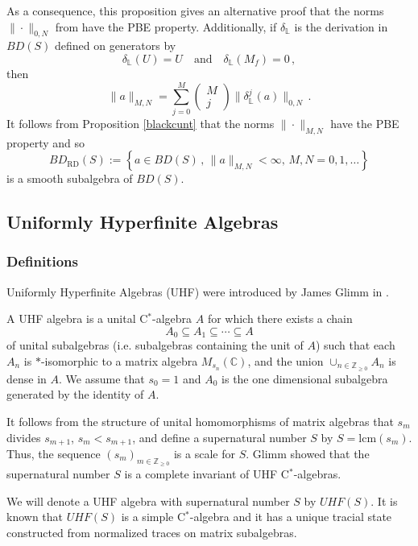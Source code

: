 \documentclass[12pt,reqno]{amsart}
\numberwithin{equation}{section}
\newcommand{\C}{{\mathbb C}}
\newcommand{\Z}{{\mathbb Z}}
\begin{document}
As a consequence, this proposition gives an alternative proof that the norms $\|\cdot\|_{0,N}$ from \cite{HKM1} have the PBE property.  Additionally, if $\delta_{\mathbb{L}}$ is the derivation in $BD(S)$ defined on generators by
\begin{equation*}
\delta_{\mathbb L}(U)=U\quad\textrm{and}\quad \delta_{\mathbb L}(M_f)=0\,,
\end{equation*}
then 
\begin{equation*}
\|a\|_{M,N} = \sum_{j=0}^M\left(
\begin{array}{c}
M \\ j
\end{array}\right)\|\delta_{\mathbb L}^{j}(a)\|_{0,N}\,.
\end{equation*}
It follows from Proposition \ref{blackcunt} that the norms $\|\cdot\|_{M,N}$ have the PBE property and so
\begin{equation*}
BD_\textrm{RD}(S) := \left\{a\in BD(S)\,,\,\|a\|_{M,N}<\infty,\,M,N=0,1,\ldots\right\}
\end{equation*}
is a smooth subalgebra of $BD(S)$.

\subsection{Uniformly Hyperfinite Algebras} 
\subsubsection{Definitions}
Uniformly Hyperfinite Algebras (UHF) were introduced by James Glimm  in  \cite{Gl}. 

A UHF algebra is a unital C$^*$-algebra $A$ for which there exists a chain 
$$A_0 \subseteq A_1 \subseteq \cdots\subseteq A$$
of unital subalgebras (i.e. subalgebras containing the unit of $A$) such that each $A_n$ is $*$-isomorphic to a matrix algebra $M_{s_n} (\C)$, and the union
$\cup_{n\in\Z_{\geq0}}A_n$ is dense in $A$. We assume that $s_0=1$ and $A_0$ is the one dimensional subalgebra generated by the identity of $A$.

It follows from the structure of unital homomorphisms of matrix algebras that $s_m$ divides $s_{m+1}$, $s_m<s_{m+1}$, and define a supernatural number $S$ by $S=\mathrm{lcm}(s_m)$. Thus, the sequence $(s_m)_{m\in\Z_{\geq0}}$ is a scale for $S$.
Glimm showed that the supernatural number $S$ is a complete invariant of UHF C$^*$-algebras. 

We will denote a UHF algebra with supernatural number $S$ by $UHF(S)$.
It is known \cite{Dav} that $UHF(S)$ is a simple C$^*$-algebra and it has a unique tracial state constructed from normalized traces on matrix subalgebras.
\end{document}
